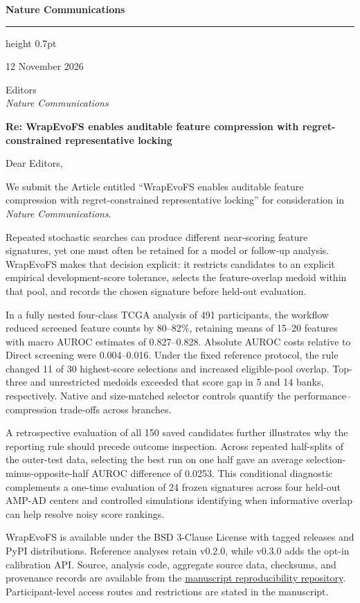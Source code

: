 \documentclass[10pt,letterpaper]{article}
\begin{document}
{\sffamily\bfseries\Large Nature Communications}\par
\vspace{2pt}\hrule height 0.7pt\vspace{15pt}
\begin{flushright}12 November 2026\end{flushright}
Editors\\
\textit{Nature Communications}

\textbf{Re: WrapEvoFS enables auditable feature compression with regret-constrained representative locking}

Dear Editors,

We submit the Article entitled ``WrapEvoFS enables auditable feature compression with regret-constrained representative locking'' for consideration in \textit{Nature Communications}.

Repeated stochastic searches can produce different near-scoring feature signatures, yet one must often be retained for a model or follow-up analysis. WrapEvoFS makes that decision explicit: it restricts candidates to an explicit empirical development-score tolerance, selects the feature-overlap medoid within that pool, and records the chosen signature before held-out evaluation.

In a fully nested four-class TCGA analysis of 491 participants, the workflow reduced screened feature counts by 80--82\%, retaining means of 15--20 features with macro AUROC estimates of 0.827--0.828. Absolute AUROC costs relative to Direct screening were 0.004--0.016. Under the fixed reference protocol, the rule changed 11 of 30 highest-score selections and increased eligible-pool overlap. Top-three and unrestricted medoids exceeded that score gap in 5 and 14 banks, respectively. Native and size-matched selector controls quantify the performance--compression trade-offs across branches.

A retrospective evaluation of all 150 saved candidates further illustrates why the reporting rule should precede outcome inspection. Across repeated half-splits of the outer-test data, selecting the best run on one half gave an average selection-minus-opposite-half AUROC difference of 0.0253. This conditional diagnostic complements a one-time evaluation of 24 frozen signatures across four held-out AMP-AD centers and controlled simulations identifying when informative overlap can help resolve noisy score rankings.

WrapEvoFS is available under the BSD 3-Clause License with tagged releases and PyPI distributions. Reference analyses retain v0.2.0, while v0.3.0 adds the opt-in calibration API. Source, analysis code, aggregate source data, checksums, and provenance records are available from the \href{https://github.com/junseoparkX/wrapevofs-manuscript-reproducibility}{manuscript reproducibility repository}. Participant-level access routes and restrictions are stated in the manuscript.
\end{document}
